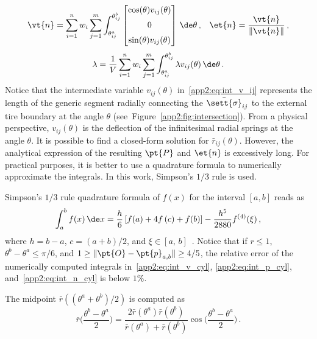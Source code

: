 %
\begin{equation}
  \vt{n} =
  \sum_{i=1}^{n}w_i\sum_{j=1}^{m} \displaystyle\int_{\theta^a_{ij}}^{\theta^b_{ij}}
  \begin{bmatrix}
    \cos(\theta)v_{ij}(\theta)
    \\[2mm]
    0
    \\[2mm]
    \sin(\theta)v_{ij}(\theta)
  \end{bmatrix} \, \de\theta  \, \text{,} \quad
  \et{n} = \dfrac{\vt{n}}{\|\vt{n}\|}
   \, \text{,}
  \label{app2:eq:int_n_cyl}
\end{equation}
%
\begin{equation}
  \lambda = \dfrac{1}{V} \sum_{i=1}^{n}w_i\sum_{j=1}^{m} \int_{\theta^a_{ij}}^{\theta^b_{ij}} \lambda v_{ij}(\theta) \, \de\theta
  \, \text{.}
  \label{app2:eq:int_l_cyl}
\end{equation}
%
Notice that the intermediate variable $v_{ij}(\theta)$ in~\eqref{app2:eq:int_v_ij} represents the length of the generic segment radially connecting the $\bar{\sett{\sigma}}_{ij}$ to the external tire boundary at the angle $\theta$ (see~Figure~\ref{app2:fig:intersection}). From a physical perspective, $v_{ij}(\theta)$ is the deflection of the infinitesimal radial springs at the angle $\theta$. It is possible to find a closed-form solution for $\bar{r}_{ij}(\theta)$. However, the analytical expression of the resulting $\pt{P}$ and $\et{n}$ is excessively long. For practical purposes, it is better to use a quadrature formula to numerically approximate the integrals. In this work, Simpson's $1/3$ rule is used.
%
\begin{remark}
  Simpson's $1/3$ rule quadrature formula of $f(x)$ for the interval $[a,b]$ reads as
  \begin{equation*}
    \int_{a}^b f(x)\,\de x = \dfrac{h}{6}\left[ f(a) + 4f\left(c\right)+f(b)\right] - \dfrac{h^5}{2880} f^{(4)}(\xi)
     \, \text{,}
  \end{equation*}
  where $h = b-a$, $c = (a+b)/2$, and $\xi \in [a, \, b]$~\cite{stoer2002introduction}. Notice that if $r \leq 1$, $\theta^b-\theta^a \leq \pi/6$, and $1 \geq \|\pt{O}-\pt{p}_{a,b}\| \geq 4/5$, the relative error of the numerically computed integrals in~\eqref{app2:eq:int_v_cyl}, \eqref{app2:eq:int_p_cyl}, and~\eqref{app2:eq:int_n_cyl} is below $1\%$.
\end{remark}
%
\begin{remark}
  The midpoint $\bar{r}((\theta^a+\theta^b)/2)$ is computed as
  \begin{equation*}
    \bar{r}\bigg(\dfrac{\theta^b-\theta^a}{2}\bigg) = \dfrac{2\bar{r}(\theta^a)\bar{r}(\theta^b)}{\bar{r}(\theta^a)+\bar{r}(\theta^b)}\cos\bigg(\dfrac{\theta^b-\theta^a}{2}\bigg)
    \, \text{.}
  \end{equation*}
\end{remark}

